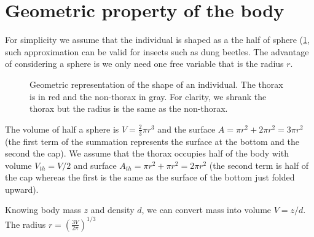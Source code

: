 \documentclass[12pt]{article}
\begin{document}
\section{Geometric property of the body}
For simplicity we assume that the individual is shaped as a the half of sphere (\cref{fig:geo}, such approximation can be valid for insects such as dung beetles.
The advantage of considering a sphere is we only need one free variable that is the radius $r$.
\begin{figure}
\begin{center}
	\caption{Geometric representation of the shape of an individual.
	The thorax is in red and the non-thorax in gray.  
	For clarity, we shrank the thorax but the radius is the same as the non-thorax.
	}
	\label{fig:geo}
\end{center}
\end{figure}
The volume of half a sphere is $V = \frac{2}{3} \pi r^3$ and the surface $A = \pi r^2 + 2 \pi r^ 2 = 3 \pi r^2$ (the first term of the summation represents the surface at the bottom and the second the cap).
We assume that the thorax occupies half of the body with volume $V_{th} = V/2$ and surface $A_{th} = \pi r^2 + \pi r^2 = 2 \pi r^2$ (the second term is half of the cap whereas the first is the same as the surface of the bottom just folded upward).
  
Knowing body mass $z$ and density $d$, we can convert mass into volume $ V = z/d$.
The radius $r = \left( \frac{3V}{2 \pi} \right)^{1/3}$ 
\end{document}
